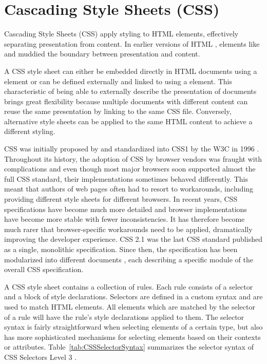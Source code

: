 \section{Cascading Style Sheets (CSS)}
\label{sec:CSS}

Cascading Style Sheets (CSS) apply styling to HTML elements,
effectively separating presentation from content. In earlier versions
of HTML \parencite{HTML32}, elements like  and
 muddied the boundary between presentation and content.

A CSS style sheet can either be embedded directly in HTML documents
using a  element or can be defined externally and
linked to using a  element. This characteristic of
being able to externally describe the presentation of documents brings
great flexibility because multiple documents with different content
can reuse the same presentation by linking to the same CSS file.
Conversely, alternative style sheets can be applied to the same HTML
content to achieve a different styling.

CSS was initially proposed by \textcite{CSSProposal} and standardized
into CSS1 by the W3C in 1996 \parencite{CSS1}. Throughout its history,
the adoption of CSS by browser vendors was fraught with complications
and even though most major browsers soon supported almost the full CSS
standard, their implementations sometimes behaved differently. This
meant that authors of web pages often had to resort to workarounds,
including providing different style sheets for different browsers. In
recent years, CSS specifications have become much more detailed
\parencite{CSS21} and browser implementations have become more stable
with fewer inconsistencies. It has therefore become much rarer that
browser-specific workarounds need to be applied, dramatically
improving the developer experience. CSS 2.1 \parencite{CSS21} was the
last CSS standard published as a single, monolithic
specification. Since then, the specification has been modularized into
different documents \parencite{CSSSnapshot2020}, each describing a
specific module of the overall CSS specification.
 

A CSS style sheet contains a collection of rules. Each rule consists
of a selector and a block of style declarations. Selectors are defined
in a custom syntax and are used to match HTML elements.  All elements
which are matched by the selector of a rule will have the rule's style
declarations applied to them. The selector syntax is fairly
straightforward when selecting elements of a certain type, but also
has more sophisticated mechanisms for selecting elements based on
their contexts or attributes. Table~\ref{tab:CSSSelectorSyntax}
summarizes the selector syntax of CSS Selectors Level 3
\parencite{CSSSelectors3}.




